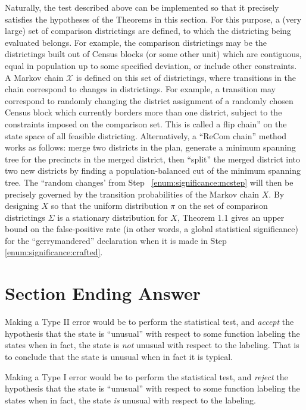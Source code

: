 \documentclass[12pt]{article}
\begin{document}
Naturally, the test described above can be implemented so that it
precisely satisfies the hypotheses of the Theorems in this section.  For
this purpose, a (very large) set of comparison districtings are defined,
to which the districting being evaluated belongs.  For example, the
comparison districtings may be the districtings built out of Census
blocks (or some other unit) which are contiguous, equal in population up
to some specified deviation, or include other constraints.  A Markov
chain \( \mathcal{X} \) is defined on this set of districtings, where
transitions in the chain correspond to changes in districtings.  For
example, a transition may correspond to randomly changing the district
assignment of a randomly chosen Census block which currently borders
more than one district, subject to the constraints imposed on the
comparison set.  This is called a flip chain'' on the state space of all
feasible districting.  Alternatively, a ``ReCom chain'' method works as
follows:  merge two districts in the plan, generate a minimum spanning
tree for the precincts in the merged district, then ``split'' the merged
district into two new districts by finding a population-balanced cut of
the minimum spanning tree.  The ``random changes' from Step~%
\ref{enum:significance:mcstep} will then be precisely governed by the
transition probabilities of the Markov chain \( X \).  By designing \( X
\) so that the uniform distribution \( \pi \) on the set of comparison
districtings \( \Sigma \) is a stationary distribution for \( X \),
Theorem 1.1 gives an upper bound on the false-positive rate (in other
words, a global statistical significance) for the ``gerrymandered''
declaration when it is made in Step~%
\ref{enum:significance:crafted}.


\section*{Section Ending Answer}

Making a Type II error would be to perform the statistical test,
and \emph{accept} the hypothesis that the state is ``unusual'' with
respect to some function labeling the states when in fact, the state
is \emph{not} unusual with respect to the labeling.  That is to
conclude that the state is unusual when in fact it is typical.

Making a Type I error would be to perform the statistical test,
and \emph{reject} the hypothesis that the state is ``unusual'' with
respect to some function labeling the states when in fact, the state
\emph{is} unusual with respect to the labeling.
\end{document}
